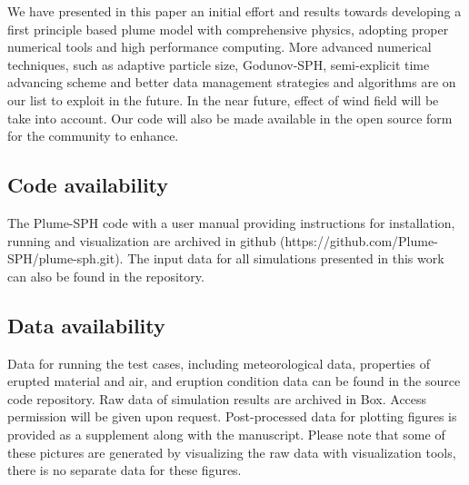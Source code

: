 \documentclass[journal abbreviation, manuscript]{copernicus}
\begin{document}
We have presented in this paper an initial effort and results towards developing a first principle based plume model with comprehensive physics, adopting proper numerical tools and high performance computing. More advanced numerical techniques, such as adaptive particle size, Godunov-SPH, semi-explicit time advancing scheme and better data management strategies and algorithms are on our list to exploit in the future. In the near future, effect of wind field will be take into account. Our code will also be made available in the open source form for the community to enhance.

\subsection{Code availability}
The Plume-SPH code with a user manual providing instructions for installation, running and visualization are archived in github (https://github.com/Plume-SPH/plume-sph.git). The input data for all simulations presented in this work can also be found in the repository.

\subsection{Data availability}
Data for running the test cases, including meteorological data, properties of erupted material and air, and eruption condition data can be found in the source code repository. Raw data of simulation results are archived in Box. Access permission will be given upon request. Post-processed data for plotting figures is provided as a supplement along with the manuscript. Please note that some of these pictures are generated by visualizing the raw data with visualization tools, there is no separate data for these figures.
%
%
%
\end{document}
